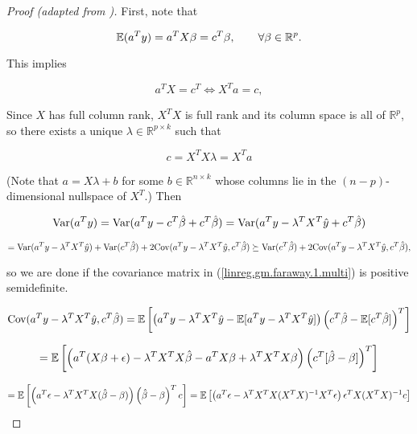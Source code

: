 \begin{proof}[Proof (adapted from \citet{faraway2002})]

First, note that

\[
\E(a^Ty) = a^TX \beta = c^T\beta, \qquad \forall \beta \in \mathbb{R}^p.
\]

This implies 

\begin{equation}
a^TX = c^T \iff X^T a = c,
\end{equation}

Since \(X\) has full column rank, \(X^TX\) is full rank and its column space is all of \(\mathbb{R}^p\), so there exists a unique \(\lambda \in \mathbb{R}^{p \times k}\) such that

\begin{equation}\label{linreg.gm.faraway.2.multi}
c = X^TX \lambda = X^Ta
\end{equation}



(Note that \(a = X \lambda + b\) for some \(b \in \mathbb{R}^{n \times k}\) whose columns lie in the \((n - p)\)-dimensional nullspace of \(X^T\).) Then

\[
\Var(a^Ty) = \Var( a^Ty - c^T \hat{\beta} + c^T \hat{\beta}) = \Var( a^Ty - \lambda^T X^T \hat{y} + c^T \hat{\beta}) 
\]

\begin{equation}\label{linreg.gm.faraway.1.multi}
= \Var( a^Ty - \lambda^T X^T \hat{y}) + \Var(c^T \hat{\beta})  + 2 \Cov (a^Ty - \lambda^T X^T \hat{y}, c^T \hat{\beta}) \succeq \Var(c^T \hat{\beta})  + 2 \Cov (a^Ty - \lambda^T X^T \hat{y}, c^T \hat{\beta}),
\end{equation}

so we are done if the covariance matrix in (\ref{linreg.gm.faraway.1.multi}) is positive semidefinite.

\[
\Cov (a^Ty - \lambda^T X^T \hat{y}, c^T \hat{\beta}) = \E \left[ \left( a^Ty - \lambda^T X^T \hat{y} - \E[ a^Ty - \lambda^T X^T \hat{y}] \right) \left(c^T \hat{\beta} - \E[ c^T \hat{\beta}] \right)^T  \right]
\]

\[
= \E \left[ \left( a^T(X \beta + \epsilon) - \lambda^T X^T X \hat{\beta} -  a^TX \beta + \lambda^T X^T X \beta \right) \left(c^T [ \hat{\beta} -  \beta ]\right)^T  \right]
\]

\[
= \E \left[ \left( a^T \epsilon - \lambda^T X^T X( \hat{\beta} - \beta)  \right)  \left( \hat{\beta} - \beta \right)^T c  \right] = \E \left[ \left( a^T \epsilon - \lambda^T X^T X (X^TX)^{-1} X^T \epsilon  \right) \epsilon^T X (X^TX)^{-1}   c \right] 
\]


\end{proof}
